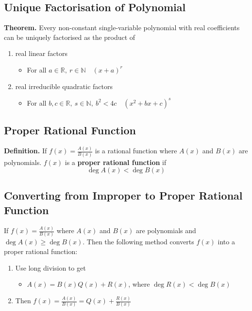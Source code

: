 \documentclass[../ma2002_notes.tex]{subfiles}
\begin{document}
\subsection{Unique Factorisation of Polynomial}
\textbf{Theorem.} Every non-constant single-variable polynomial with real coefficients can be uniquely factorised as the product of
\begin{enumerate}
	\item real linear factors
	\begin{itemize}
		\item For all \(a\in\mathbb{R},\ r\in\mathbb{N}\quad(x+a)^r\)
	\end{itemize}
	\item real irreducible quadratic factors
	\begin{itemize}
		\item For all \(b,c\in\mathbb{R},\ s\in\mathbb{N},\ b^2<4c\quad(x^2+bx+c)^s\)
	\end{itemize}
\end{enumerate}

\subsection{Proper Rational Function}
\textbf{Definition.} If \(f(x)=\frac{A(x)}{B(x)}\) is a rational function where \(A(x)\) and \(B(x)\) are polynomials. \(f(x)\) is a \textbf{proper rational function} if
\[\deg A(x)<\deg B(x)\]

\subsection{Converting from Improper to Proper Rational Function}
If \(f(x)=\frac{A(x)}{B(x)}\) where \(A(x)\) and \(B(x)\) are polynomials and \(\deg A(x)\geq\deg B(x)\). Then the following method converts \(f(x)\) into a proper rational function:
\begin{enumerate}
	\item Use long division to get
	\begin{itemize}
		\item\(A(x)=B(x)Q(x)+R(x)\), where \(\deg R(x)<\deg B(x)\)
	\end{itemize}
	\item Then \(f(x)=\frac{A(x)}{B(x)}=Q(x)+\frac{R(x)}{B(x)}\)
\end{enumerate}
\end{document}
